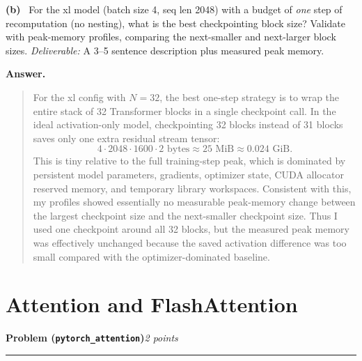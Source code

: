 \documentclass[11pt]{article}
\newcommand{\problem}[2]{%
  \vspace{0.6em}%
  \noindent\textbf{Problem (\texttt{#1})}\hfill\textit{#2 points}\par%
  \vspace{0.2em}\hrule\vspace{0.4em}%
}
\newcommand{\subq}[1]{\vspace{0.3em}\noindent\textbf{(#1)}\ }
\newcommand{\deliverable}[1]{\vspace{0.2em}\noindent\textit{Deliverable:} #1\par}
\newenvironment{answer}{%
  \vspace{0.3em}%
  \noindent\textbf{Answer.}\begin{quote}%
}{%
  \end{quote}\vspace{0.4em}%
}
\begin{document}
\subq{b} For the xl model (batch size 4, seq len 2048) with a budget of \emph{one} step of recomputation (no nesting), what is the best checkpointing block size? Validate with peak-memory profiles, comparing the next-smaller and next-larger block sizes.
\deliverable{A 3--5 sentence description plus measured peak memory.}
\begin{answer}
  For the xl config with $N=32$, the best one-step strategy is to wrap the
entire stack of 32 Transformer blocks in a single checkpoint call. In the
ideal activation-only model, checkpointing 32 blocks instead of 31 blocks saves
only one extra residual stream tensor:
\[
4 \cdot 2048 \cdot 1600 \cdot 2 \text{ bytes}
\approx 25 \text{ MiB}
\approx 0.024 \text{ GiB}.
\]
This is tiny relative to the full training-step peak, which is dominated by
persistent model parameters, gradients, optimizer state, CUDA allocator
reserved memory, and temporary library workspaces. Consistent with this, my
profiles showed essentially no measurable peak-memory change between the
largest checkpoint size and the next-smaller checkpoint size. Thus I used one
checkpoint around all 32 blocks, but the measured peak memory was effectively
unchanged because the saved activation difference was too small compared with
the optimizer-dominated baseline.
\end{answer}


\section{Attention and FlashAttention}

\problem{pytorch\_attention}{2}
\end{document}
